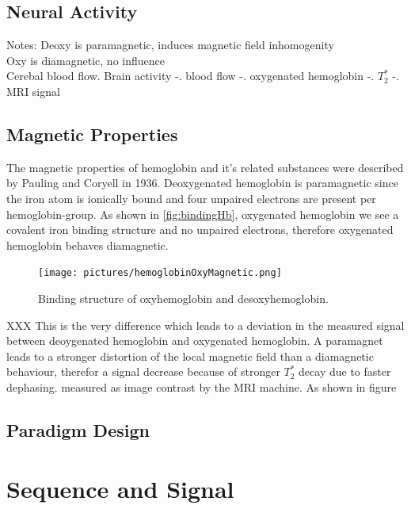 \documentclass[a4paper]{scrartcl}
\begin{document}
\subsection{Neural Activity}


Notes:
Deoxy is paramagnetic, induces magnetic field inhomogenity \\
Oxy is diamagnetic, no influence \\
Cerebal blood flow. Brain activity -. blood flow -. oxygenated hemoglobin -. $T_2^*$ -. MRI signal

\subsection{Magnetic Properties}
\label{sub:magneticProperties}
The magnetic properties of hemoglobin and it's related substances were described by Pauling and Coryell in 1936.\cite{pauling}
Deoxygenated hemoglobin is paramagnetic since the iron atom is ionically bound and four unpaired electrons are present per hemoglobin-group. 
As shown in \autoref{fig:bindingHb}, oxygenated hemoglobin we see a covalent iron binding structure and no unpaired electrons, therefore oxygenated hemoglobin behaves diamagnetic.\cite{Zborowski}
\begin{figure}[hb]
  \centering
  \texttt{[image: pictures/hemoglobinOxyMagnetic.png]}
  \caption{Binding structure of oxyhemoglobin and desoxyhemoglobin.\cite[2]{Bren}}
  \label{fig:bindingHb}
\end{figure}
XXX
This is the very difference which leads to a deviation in the measured signal between deoygenated hemoglobin and oxygenated hemoglobin.
A paramagnet leads to a stronger distortion of the local magnetic field than a diamagnetic behaviour, therefor a signal decrease because of stronger $T_2^*$ decay due to faster dephasing.
measured as image contrast by the MRI machine. As shown in figure 

\subsection{Paradigm Design}

\section{Sequence and Signal}
\label{sec:sequenceSignal}
\end{document}
